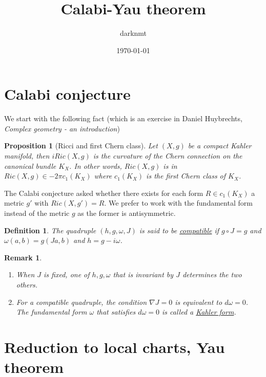 \documentclass[11pt]{article}
\author{darknmt}
\date{\today}
\title{Calabi-Yau theorem}
\newtheorem{remark}{Remark}
\newtheorem{proposition}{Proposition}[theorem]
\newtheorem{definition}{Definition}
\begin{document}
\maketitle
\tableofcontents


\section{Calabi conjecture}
\label{sec:orga14e31f}
We start with the following fact (which is an exercise in Daniel Huybrechts, \emph{Complex geometry - an introduction})

\begin{proposition}[Ricci and first Chern class]
Let \((X,g)\) be a compact Kahler manifold, then \(iRic(X,g)\) is the curvature of the Chern connection
on the canonical bundle \(K_X\). In other words, \(Ric(X,g)\) is in \(Ric(X,g)\in -2\pi c_1(K_X)\) where
\(c_1(K_X)\) is the first Chern class of \(K_X\).
\end{proposition}

The Calabi conjecture asked whether there exists for each form \(R\in c_1(K_X)\) a metric \(g'\) with
\(Ric(X,g') = R\). We prefer to work with the fundamental form instead of the metric \(g\) as the former
is antisymmetric.

\begin{definition}
The quadruple \((h, g, \omega, J)\) is said to be \uline{compatible} if \(g\circ J = g\) and \(\omega(a,b) =
g(Ja,b)\) and \(h = g - i\omega\). 
\end{definition}

\begin{remark}
\begin{enumerate}
\item When \(J\) is fixed, one of \(h,g,\omega\) that is invariant by \(J\) determines the two others.
\item For a compatible quadruple, the condition \(\nabla J = 0\) is equivalent to \(d\omega = 0\). The
fundamental form \(\omega\) that satisfies \(d\omega = 0\) is called a \uline{Kahler form}.
\end{enumerate}
\end{remark}


\section{Reduction to local charts, Yau theorem}
\label{sec:org9e0aa91}
\end{document}
